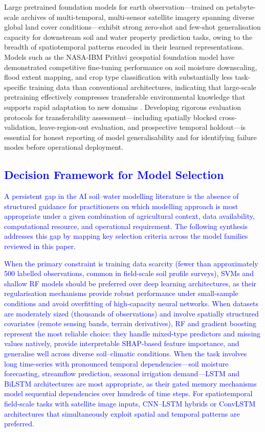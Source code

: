 \documentclass[land,article,submit,pdftex,moreauthors]{Definitions/mdpi}
\numberwithin{equation}{section}
\begin{document}
Large pretrained foundation models for earth observation---trained on petabyte-scale archives of multi-temporal, multi-sensor satellite imagery spanning diverse global land cover conditions---exhibit strong zero-shot and few-shot generalisation capacity for downstream soil and water property prediction tasks, owing to the breadth of spatiotemporal patterns encoded in their learned representations. Models such as the NASA-IBM Prithvi geospatial foundation model have demonstrated competitive fine-tuning performance on soil moisture downscaling, flood extent mapping, and crop type classification with substantially less task-specific training data than conventional architectures, indicating that large-scale pretraining effectively compresses transferable environmental knowledge that supports rapid adaptation to new domains \citep{jakubik2023foundation}. Developing rigorous evaluation protocols for transferability assessment---including spatially blocked cross-validation, leave-region-out evaluation, and prospective temporal holdout---is essential for honest reporting of model generalisability and for identifying failure modes before operational deployment.


\subsection{\textcolor{blue}{Decision Framework for Model Selection}}

\textcolor{blue}{A persistent gap in the AI soil--water modelling literature is the absence of structured guidance for practitioners on which modelling approach is most appropriate under a given combination of agricultural context, data availability, computational resource, and operational requirement. The following synthesis addresses this gap by mapping key selection criteria across the model families reviewed in this paper.}

\textcolor{blue}{When the primary constraint is training data scarcity (fewer than approximately 500 labelled observations, common in field-scale soil profile surveys), SVMs and shallow RF models should be preferred over deep learning architectures, as their regularisation mechanisms provide robust performance under small-sample conditions and avoid overfitting of high-capacity neural networks. When datasets are moderately sized (thousands of observations) and involve spatially structured covariates (remote sensing bands, terrain derivatives), RF and gradient boosting represent the most reliable choice: they handle mixed-type predictors and missing values natively, provide interpretable SHAP-based feature importance, and generalise well across diverse soil--climatic conditions. When the task involves long time-series with pronounced temporal dependencies---soil moisture forecasting, streamflow prediction, seasonal irrigation demand---LSTM and BiLSTM architectures are most appropriate, as their gated memory mechanisms model sequential dependencies over hundreds of time steps. For spatiotemporal field-scale tasks with satellite image inputs, CNN--LSTM hybrids or ConvLSTM architectures that simultaneously exploit spatial and temporal patterns are preferred.} 
\end{document}
